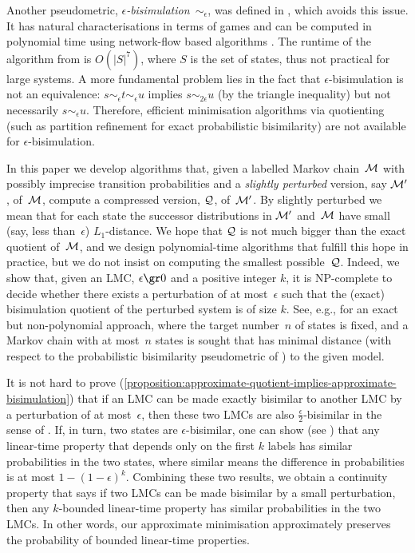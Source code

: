 Another pseudometric, \emph{$\epsilon$-bisimulation~$\mathord{\sim_{\epsilon}}$}, was defined in \cite{DesharnaisLavoletteTracol2008}, which avoids this issue.
It has natural characterisations in terms of games and can be computed in polynomial time using network-flow based algorithms \cite{DesharnaisLavoletteTracol2008}.
The runtime of the algorithm from \cite{DesharnaisLavoletteTracol2008} is $O(|S|^7)$, where $S$ is the set of states, thus not practical for large systems.
A more fundamental problem lies in the fact that $\epsilon$-bisimulation is not an equivalence: $s \sim_\epsilon t \sim_\epsilon u$ implies $s \sim_{2 \epsilon} u$ (by the triangle inequality) but not necessarily $s \sim_{\epsilon} u$.
Therefore, efficient minimisation algorithms via quotienting (such as partition refinement for exact probabilistic bisimilarity) are not available for $\epsilon$-bisimulation.

In this paper we develop algorithms that, given a labelled Markov chain~$\mathcal{M}$ with possibly imprecise transition probabilities and a \emph{slightly perturbed} version, say $\mathcal{M}'$, of~$\mathcal{M}$, compute a compressed version, $\mathcal{Q}$, of~$\mathcal{M}'$.
By slightly perturbed we mean that for each state the successor distributions in $\mathcal{M}'$ and~$\mathcal{M}$ have small (say, less than~$\epsilon$) $L_1$-distance.
We hope that $\mathcal{Q}$ is not much bigger than the exact quotient of~$\mathcal{M}$, and we design polynomial-time algorithms that fulfill this hope in practice, but we do not insist on computing the smallest possible~$\mathcal{Q}$.
Indeed, we show that, given an LMC, $\epsilon \gr 0$ and a positive integer $k$, it is {\sf NP}-complete to decide whether there exists a perturbation of at most~$\epsilon$ such that the (exact) bisimulation quotient of the perturbed system is of size $k$.
See, e.g., \cite{BacciBLM18} for an exact but non-polynomial approach, where the target number~$n$ of states is fixed, and a Markov chain with at most~$n$ states is sought that has minimal distance (with respect to the probabilistic bisimilarity pseudometric of \cite{DesharnaisGJP04}) to the given model.

It is not hard to prove (\cref{proposition:approximate-quotient-implies-approximate-bisimulation}) that if an LMC can be made exactly bisimilar to another LMC by a perturbation of at most~$\epsilon$, then these two LMCs are also $\frac{\epsilon}{2}$-bisimilar in the sense of \cite{DesharnaisLavoletteTracol2008}.
If, in turn, two states are $\epsilon$-bisimilar, one can show (see \cite[Theorem~4]{BianA17}) that any linear-time property that depends only on the first $k$ labels has similar probabilities in the two states, where similar means the difference in probabilities is at most $1 - (1-\epsilon)^k$. %
Combining these two results, we obtain a continuity property that says if two LMCs can be made bisimilar by a small perturbation, then any $k$-bounded linear-time property has similar probabilities in the two LMCs.
In other words, our approximate minimisation approximately preserves the probability of bounded linear-time properties.

